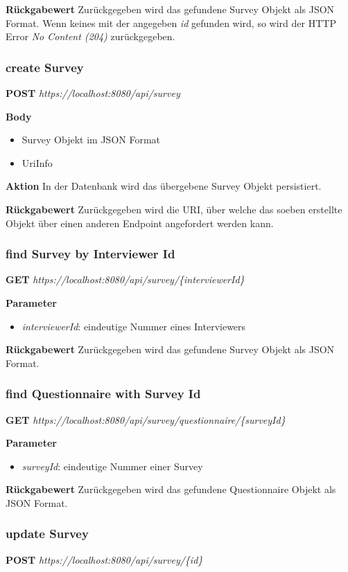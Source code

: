 \textbf{Rückgabewert}
Zurückgegeben wird das gefundene Survey Objekt als JSON Format. Wenn keines mit der angegeben \emph{id} gefunden wird, so wird der
HTTP Error \emph{No Content (204)} zurückgegeben.


\subsubsection{create Survey}
\textbf{POST} \emph{https://localhost:8080/api/survey}

\textbf{Body}
\begin{itemize}
    \item Survey Objekt im JSON Format
    \item UriInfo
\end{itemize}

\textbf{Aktion}
In der Datenbank wird das übergebene Survey Objekt persistiert.

\textbf{Rückgabewert}
Zurückgegeben wird die URI, über welche das soeben erstellte Objekt über einen anderen Endpoint angefordert werden kann.

\subsubsection{find Survey by Interviewer Id}
\textbf{GET} \emph{https://localhost:8080/api/survey/\{interviewerId\}}

\textbf{Parameter}
\begin{itemize}
    \item \emph{interviewerId}: eindeutige Nummer eines Interviewers
\end{itemize}

\textbf{Rückgabewert}
Zurückgegeben wird das gefundene Survey Objekt als JSON Format. 

\subsubsection{find Questionnaire with Survey Id}
\textbf{GET} \emph{https://localhost:8080/api/survey/questionnaire/\{surveyId\}}

\textbf{Parameter}
\begin{itemize}
    \item \emph{surveyId}: eindeutige Nummer einer Survey
\end{itemize}

\textbf{Rückgabewert}
Zurückgegeben wird das gefundene Questionnaire Objekt als JSON Format.

\subsubsection{update Survey}
\textbf{POST} \emph{https://localhost:8080/api/survey/\{id\}}


